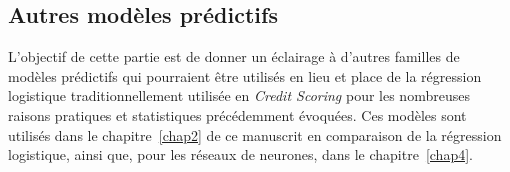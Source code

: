 \subsection{Autres modèles prédictifs}

L'objectif de cette partie est de donner un éclairage à d'autres familles de modèles prédictifs qui pourraient être utilisés en lieu et place de la régression logistique traditionnellement utilisée en \textit{Credit Scoring} pour les nombreuses raisons pratiques et statistiques précédemment évoquées. Ces modèles sont utilisés dans le chapitre~\ref{chap2} de ce manuscrit en comparaison de la régression logistique, ainsi que, pour les réseaux de neurones, dans le chapitre~\ref{chap4}.

%
%
%
%
%
